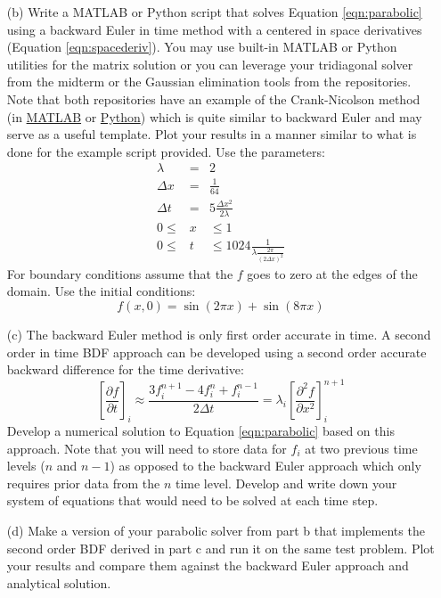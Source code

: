 \documentclass{article}
\begin{document}
\begin{enumerate}
\begin{enumerate}
    \item[(b)]  Write a MATLAB or Python script that solves Equation \ref{eqn:parabolic} using a backward Euler in time method with a centered in space derivatives (Equation \ref{eqn:spacederiv}).  You may use built-in MATLAB or Python utilities for the matrix solution or you can leverage your tridiagonal solver from the midterm or the Gaussian elimination tools from the repositories.  Note that both repositories have an example of the Crank-Nicolson method (in \href{https://github.com/Zettergren-Courses/EP501_matlab/blob/master/PDEs/parabolic.m}{MATLAB} or \href{https://github.com/Zettergren-Courses/EP501_matlab/blob/master/PDEs/parabolic.m}{Python}) which is quite similar to backward Euler and may serve as a useful template.  Plot your results in a manner similar to what is done for the example script provided.  Use the parameters:
    \begin{eqnarray}
      \lambda &=& 2 \\
      \Delta x &=& \frac{1}{64} \\
      \Delta t &=& 5 \frac{\Delta x^2}{2 \lambda} \\
      0 \le &x& \le 1 \\
      0 \le &t& \le 1024 \frac{1}{ \lambda \frac{2 \pi}{\left( 2 \Delta x \right)^2} }
    \end{eqnarray}
    For boundary conditions assume that the $f$ goes to zero at the edges of the domain.  Use the initial conditions:
    \begin{equation}
      f(x,0)=\sin (2 \pi x) + \sin (8 \pi x)
    \end{equation}
    \item[(c)]  The backward Euler method is only first order accurate in time.  A second order in time BDF approach can be developed using a second order accurate backward difference for the time derivative:
    \begin{equation}
      \left[ \frac{\partial f}{\partial t} \right]_i \approx \frac{3f_i^{n+1} - 4f_i^n + f_i^{n-1}}{2 \Delta t} =  \lambda_i \left[ \frac{\partial^2 f}{\partial x^2} \right]_i^{n+1}
    \end{equation}
    Develop a numerical solution to Equation \ref{eqn:parabolic} based on this approach.  Note that you will need to store data for $f_i$ at two previous time levels ($n$ and $n-1$) as opposed to the backward Euler approach which only requires prior data from the $n$ time level.  Develop and write down your system of equations that would need to be solved at each time step.  
    \item[(d)]  Make a version of your parabolic solver from part b that implements the second order BDF derived in part c and run it on the same test problem.  Plot your results and compare them against the backward Euler approach and analytical solution.  
  \end{enumerate}

    
\end{enumerate}
\end{document}

